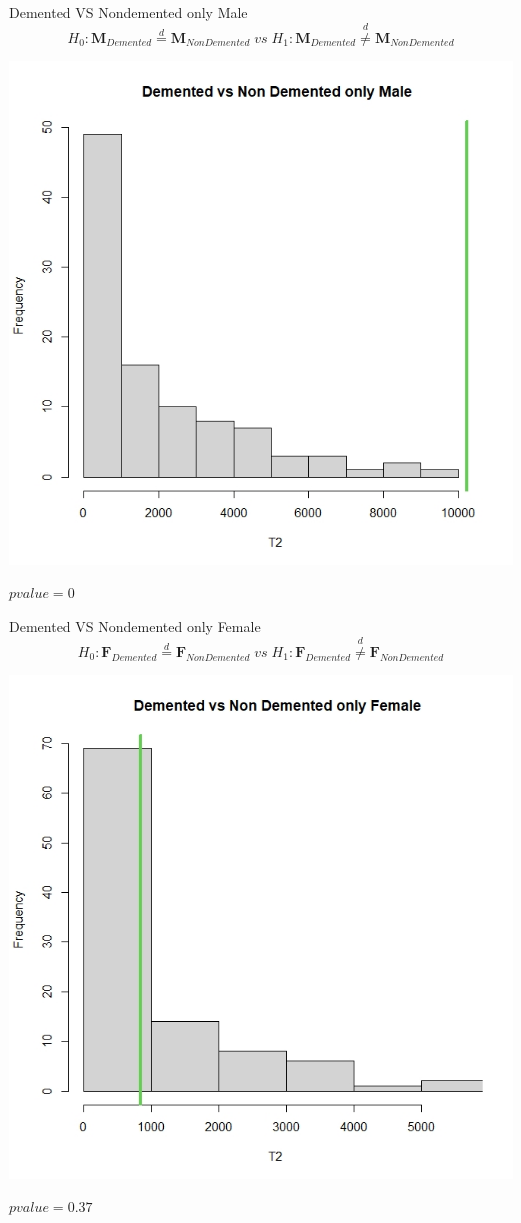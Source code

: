 \documentclass{beamer}
\begin{document}
	\begin{frame}{Demented VS Nondemented only Male}
	\vspace{-0.3cm}
	$$
	H_0: \mathbf{M}_{Demented} \overset{d}{=} \mathbf{M}_{Non Demented}\;vs\;H_1:\mathbf{M}_{Demented} \overset{d}{\neq} \mathbf{M}_{Non Demented}
	$$
	\begin{center}
		\includegraphics[width=0.5\columnwidth]{histdvsnmale.jpeg}
	\end{center}
	\vspace{-0.7cm}
	$pvalue= 0 $
	\end{frame}
	
	\begin{frame}{Demented VS Nondemented only Female}
	\vspace{-0.4cm}
	$$
	H_0: \mathbf{F}_{Demented} \overset{d}{=} \mathbf{F}_{Non Demented}\;vs\;H_1:\mathbf{F}_{Demented} \overset{d}{\neq} \mathbf{F}_{Non Demented}
	$$
	\begin{center}
		\includegraphics[width=0.5\columnwidth]{dvsnfemale.jpeg}
	\end{center}
	\vspace{-0.7cm}
	$pvalue= 0.37 $
		
	\end{frame}
	
\end{document}
